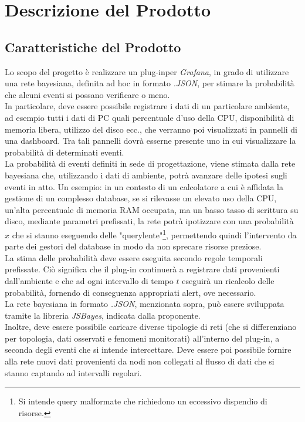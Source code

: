 \section{Descrizione del Prodotto}\label{DescrizioneProdotto}

\subsection{Caratteristiche del Prodotto}\label{CaratteristicheProdotto}
Lo scopo del progetto è realizzare un plug-in\glossario per \textit{Grafana}\glossario, in grado di utilizzare una rete bayesiana\glossario, definita ad hoc in formato \textit{.JSON}\glossario, per stimare la probabilità che alcuni eventi si possano verificare o meno.\\
In particolare, deve essere possibile registrare i dati di un particolare ambiente, ad esempio tutti i dati di PC quali percentuale d'uso della CPU, disponibilità di memoria libera, utilizzo del disco ecc., che verranno poi visualizzati in pannelli di una dashboard\glossario. Tra tali pannelli dovrà esserne presente uno in cui visualizzare la probabilità di determinati eventi.\\
La probabilità di eventi definiti in sede di progettazione, viene stimata dalla rete bayesiana che, utilizzando i dati di ambiente, potrà avanzare delle ipotesi sugli eventi in atto. Un esempio: in un contesto di un calcolatore a cui è affidata la gestione di un complesso database\glossario, se si rilevasse un elevato uso della CPU, un'alta percentuale di memoria RAM occupata, ma un basso tasso di scrittura su disco, mediante parametri prefissati, la rete potrà ipotizzare con una probabilità $x$ che si stanno eseguendo delle "query\glossario lente"\footnote{Si intende query malformate che richiedono un eccessivo dispendio di risorse.}, permettendo quindi l'intervento da parte dei gestori del database in modo da non sprecare risorse preziose.\\
La stima delle probabilità deve essere eseguita secondo regole temporali prefissate. Ciò significa che il plug-in continuerà a registrare dati provenienti dall'ambiente e che ad ogni intervallo di tempo $t$ eseguirà un ricalcolo delle probabilità, fornendo di conseguenza appropriati alert, ove necessario.\\
La rete bayesiana in formato \textit{.JSON}, menzionata sopra, può essere sviluppata tramite la libreria \textit{JSBayes}\glossario, indicata dalla proponente.\\
Inoltre, deve essere possibile caricare diverse tipologie di reti (che si differenziano per topologia, dati osservati e fenomeni monitorati) all'interno del plug-in, a seconda degli eventi che si intende intercettare. Deve essere poi possibile fornire alla rete nuovi dati provenienti da nodi non collegati al flusso di dati che si stanno captando ad intervalli regolari.

